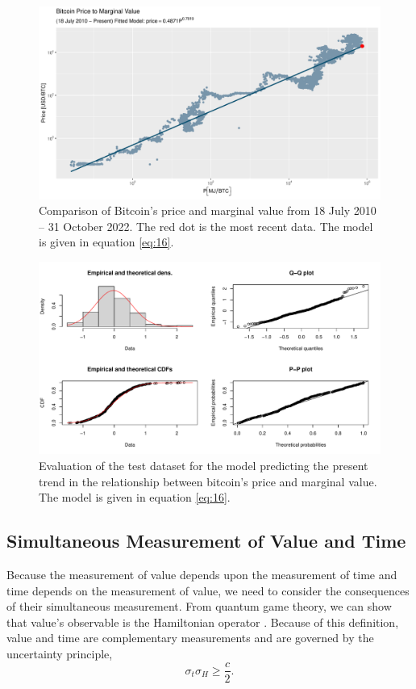 \documentclass[runningheads]{llncs}
\begin{document}
\begin{figure}
    \includegraphics[width=\textwidth]{BTC Marginal Value-Price.pdf}
    \caption{Comparison of Bitcoin's price and marginal value from 18 July 2010 -- 31 October 2022.
    The red dot is the most recent data.
    The model is given in equation \ref{eq:16}.} \label{fig:7}
\end{figure}
\begin{figure}
    \includegraphics[width=\textwidth]{BTC Price and Marginal Utility Fit Test.pdf}
    \caption{Evaluation of the test dataset for the model predicting the present trend in the relationship between bitcoin's price and marginal value.
        The model is given in equation \ref{eq:16}.} \label{fig:8}
\end{figure}

\subsection{Simultaneous Measurement of Value and Time}\label{sect:3.3}
Because the measurement of value depends upon the measurement of time and time depends on the measurement of value, we need to consider the consequences of their simultaneous measurement.
From quantum game theory, we can show that value's observable is the Hamiltonian operator \cite{abel2021entropy}.
Because of this definition, value and time are complementary measurements and are governed by the uncertainty principle,
\begin{equation}
    \sigma_t \sigma_H \ge \frac{c}{2}.\label{eq:17}
\end{equation}
\end{document}
